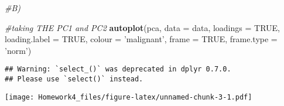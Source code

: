 \documentclass[
]{article}
\newenvironment{Shaded}{\begin{snugshade}}{\end{snugshade}}
\newcommand{\CommentTok}[1]{\textcolor[rgb]{0.56,0.35,0.01}{\textit{#1}}}
\newcommand{\DataTypeTok}[1]{\textcolor[rgb]{0.13,0.29,0.53}{#1}}
\newcommand{\KeywordTok}[1]{\textcolor[rgb]{0.13,0.29,0.53}{\textbf{#1}}}
\newcommand{\NormalTok}[1]{#1}
\newcommand{\OtherTok}[1]{\textcolor[rgb]{0.56,0.35,0.01}{#1}}
\newcommand{\StringTok}[1]{\textcolor[rgb]{0.31,0.60,0.02}{#1}}
\begin{document}
\begin{Shaded}
\begin{Highlighting}[]
\CommentTok{#B)}

\CommentTok{#taking THE PC1 and PC2 }
\KeywordTok{autoplot}\NormalTok{(pca, }\DataTypeTok{data =}\NormalTok{ data, }\DataTypeTok{loadings =} \OtherTok{TRUE}\NormalTok{, }\DataTypeTok{loading.label =} \OtherTok{TRUE}\NormalTok{, }\DataTypeTok{colour =} \StringTok{'malignant'}\NormalTok{, }\DataTypeTok{frame =} \OtherTok{TRUE}\NormalTok{, }\DataTypeTok{frame.type =} \StringTok{'norm'}\NormalTok{)}
\end{Highlighting}
\end{Shaded}

\begin{verbatim}
## Warning: `select_()` was deprecated in dplyr 0.7.0.
## Please use `select()` instead.
\end{verbatim}

\texttt{[image: Homework4\_files/figure-latex/unnamed-chunk-3-1.pdf]}
\end{document}
